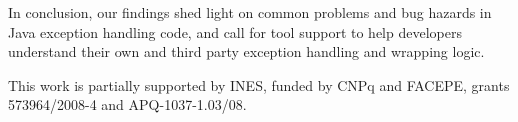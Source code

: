In conclusion, our findings shed light on common problems and bug hazards in Java
exception handling code, and call for tool support to help developers
understand their own and third party exception handling and wrapping logic.

\begin{acknowledgements}
This work is partially supported by INES, funded by CNPq and
FACEPE, grants 573964/2008-4 and APQ-1037-1.03/08.
\end{acknowledgements}





